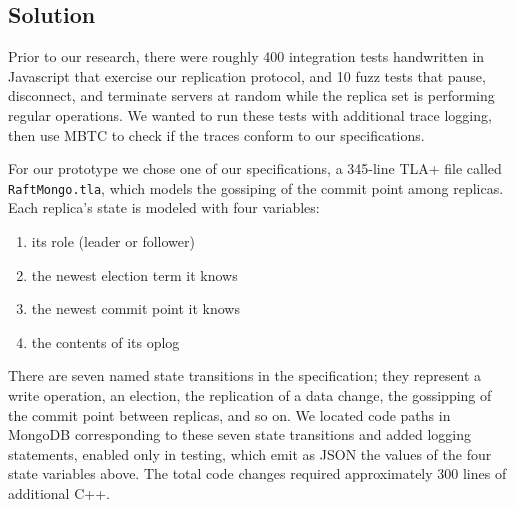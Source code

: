 \documentclass{vldb}
\begin{document}
\subsection{Solution}

Prior to our research, there were roughly 400 integration tests handwritten in Javascript that exercise our replication protocol, and 10 fuzz tests that pause, disconnect, and terminate servers at random while the replica set is performing regular operations. We wanted to run these tests with additional trace logging, then use MBTC to check if the traces conform to our specifications.

For our prototype we chose one of our specifications, a 345-line TLA+ file called \texttt{RaftMongo.tla}, which models the gossiping of the commit point among replicas. Each replica's state is modeled with four variables:

\begin{enumerate}
\item its role (leader or follower)
\item the newest election term it knows
\item the newest commit point it knows
\item the contents of its oplog
\end{enumerate}

There are seven named state transitions in the specification; they represent a write operation, an election, the replication of a data change, the gossipping of the commit point between replicas, and so on. 
We located code paths in MongoDB corresponding to these seven state transitions and added logging statements, enabled only in testing, which emit as JSON the values of the four state variables above. The total code changes required approximately 300 lines of additional C++.
\end{document}
